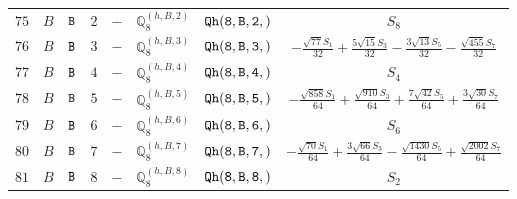 \documentclass[fleqn,8pt]{jsarticle}
\begin{document}
\begin{table}[ht!]
\begin{center}
\begin{tabular}{cccccccc}
$ 75 $ & $ B $ & $ {\tt B} $ & $ 2 $ & $ - $ & $ \mathbb{Q}_{8}^{(h,B,2)} $ & $ {\tt Qh(8,B,2,)} $ & $ S_{8} $ \\
$ 76 $ & $ B $ & $ {\tt B} $ & $ 3 $ & $ - $ & $ \mathbb{Q}_{8}^{(h,B,3)} $ & $ {\tt Qh(8,B,3,)} $ & $ - \frac{\sqrt{77} S_{1}}{32} + \frac{5 \sqrt{15} S_{3}}{32} - \frac{3 \sqrt{13} S_{5}}{32} - \frac{\sqrt{455} S_{7}}{32} $ \\
$ 77 $ & $ B $ & $ {\tt B} $ & $ 4 $ & $ - $ & $ \mathbb{Q}_{8}^{(h,B,4)} $ & $ {\tt Qh(8,B,4,)} $ & $ S_{4} $ \\
$ 78 $ & $ B $ & $ {\tt B} $ & $ 5 $ & $ - $ & $ \mathbb{Q}_{8}^{(h,B,5)} $ & $ {\tt Qh(8,B,5,)} $ & $ - \frac{\sqrt{858} S_{1}}{64} + \frac{\sqrt{910} S_{3}}{64} + \frac{7 \sqrt{42} S_{5}}{64} + \frac{3 \sqrt{30} S_{7}}{64} $ \\
$ 79 $ & $ B $ & $ {\tt B} $ & $ 6 $ & $ - $ & $ \mathbb{Q}_{8}^{(h,B,6)} $ & $ {\tt Qh(8,B,6,)} $ & $ S_{6} $ \\
$ 80 $ & $ B $ & $ {\tt B} $ & $ 7 $ & $ - $ & $ \mathbb{Q}_{8}^{(h,B,7)} $ & $ {\tt Qh(8,B,7,)} $ & $ - \frac{\sqrt{70} S_{1}}{64} + \frac{3 \sqrt{66} S_{3}}{64} - \frac{\sqrt{1430} S_{5}}{64} + \frac{\sqrt{2002} S_{7}}{64} $ \\
$ 81 $ & $ B $ & $ {\tt B} $ & $ 8 $ & $ - $ & $ \mathbb{Q}_{8}^{(h,B,8)} $ & $ {\tt Qh(8,B,8,)} $ & $ S_{2} $ \\
 \hline \hline
\end{tabular}
\end{center}
\end{table}
\end{document}
